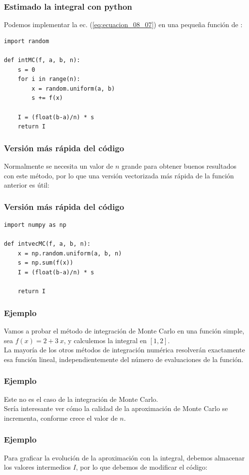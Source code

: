 \documentclass[12pt]{beamer}
\begin{document}
\begin{frame}
\frametitle{Estimado la integral con python}
Podemos implementar la ec. (\ref{eq:ecuacion_08_07}) en una pequeña función de \python:
\begin{lstlisting}[caption=Función para aproximar la integral]
import random

def intMC(f, a, b, n):
    s = 0
    for i in range(n):
        x = random.uniform(a, b)
        s += f(x)
        
    I = (float(b-a)/n) * s
    return I
\end{lstlisting}
\end{frame}
\begin{frame}[fragile]
\frametitle{Versión más rápida del código}
Normalmente se necesita un valor de $n$ grande para obtener buenos resultados con este método, por lo que una versión vectorizada más rápida de la función anterior es útil:
\end{frame}
\begin{frame}
\frametitle{Versión más rápida del código}
\begin{lstlisting}[caption=Función vectorizada para la aproximación de la integral]
import numpy as np

def intvecMC(f, a, b, n):
    x = np.random.uniform(a, b, n)
    s = np.sum(f(x))
    I = (float(b-a)/n) * s

    return I
\end{lstlisting}
\end{frame}
\begin{frame}
\frametitle{Ejemplo}
Vamos a probar el método de integración de Monte Carlo en una función simple, sea $f (x) = 2 + 3 \: x$, y calculemos la integral en $[1, 2]$.
\\
\bigskip
\pause
La mayoría de los otros métodos de integración numérica resolverán exactamente esa función lineal, independientemente del número de evaluaciones de la función.
\end{frame}
\begin{frame}
\frametitle{Ejemplo}
Este no es el caso de la integración de Monte Carlo. 
\\
\bigskip
\pause
Sería interesante ver cómo la calidad de la aproximación de Monte Carlo se incrementa, conforme crece el valor de $n$.
\end{frame}
\begin{frame}
\frametitle{Ejemplo}
Para graficar la evolución de la aproximación con la integral, debemos almacenar los valores intermedios $I$, por lo que debemos de modificar el código:
\end{frame}
\end{document}
